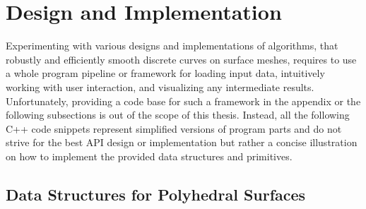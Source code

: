 \documentclass{stdlocal}
\begin{document}
\section{Design and Implementation} %
\label{sec:design}

Experimenting with various designs and implementations of algorithms, that robustly and efficiently smooth discrete curves on surface meshes, requires to use a whole program pipeline or framework for loading input data, intuitively working with user interaction, and visualizing any intermediate results.
Unfortunately, providing a code base for such a framework in the appendix or the following subsections is out of the scope of this thesis.
Instead, all the following C++ code snippets represent simplified versions of program parts and do not strive for the best API design or implementation but rather a concise illustration on how to implement the provided data structures and primitives.


\subsection{Data Structures for Polyhedral Surfaces} %
\label{sub:polyhedral_surface_data_structure}
\end{document}
